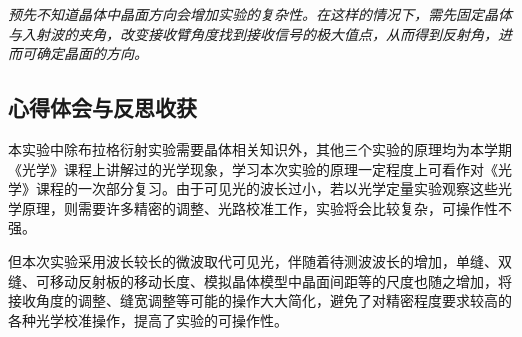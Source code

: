 \documentclass[UTF-8,twoside,cs4size]{ctexart}
\begin{document}
	\textit{预先不知道晶体中晶面方向会增加实验的复杂性。在这样的情况下，需先固定晶体与入射波的夹角，改变接收臂角度找到接收信号的极大值点，从而得到反射角，进而可确定晶面的方向。}
	\subsection{心得体会与反思收获}
	本实验中除布拉格衍射实验需要晶体相关知识外，其他三个实验的原理均为本学期《光学》课程上讲解过的光学现象，学习本次实验的原理一定程度上可看作对《光学》课程的一次部分复习。由于可见光的波长过小，若以光学定量实验观察这些光学原理，则需要许多精密的调整、光路校准工作，实验将会比较复杂，可操作性不强。
	
	但本次实验采用波长较长的微波取代可见光，伴随着待测波波长的增加，单缝、双缝、可移动反射板的移动长度、模拟晶体模型中晶面间距等的尺度也随之增加，将接收角度的调整、缝宽调整等可能的操作大大简化，避免了对精密程度要求较高的各种光学校准操作，提高了实验的可操作性。
\end{document}
